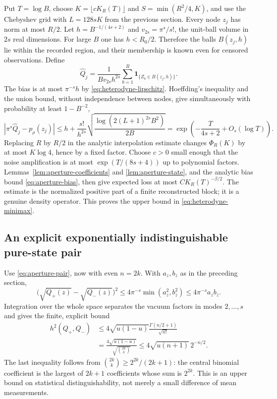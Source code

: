Put $T=\log B$, choose $K=\lfloor cK_R(T)\rfloor$ and
$S=\min(R^2/4,K)$, and use the Chebyshev grid with $L=128sK$ from the
previous section. Every node $z_j$ has norm at most $R/2$. Let
$h=B^{-1/(4s+2)}$ and $v_{2s}=\pi^s/s!$, the unit-ball volume in
$2s$ real dimensions. For large $B$ one has $h<R_0/2$. Therefore the
balls $B(z_j,h)$ lie within the recorded region, and their membership is
known even for censored observations. Define
\[
 \widehat Q_j=\frac{1}{Bv_{2s}h^{2s}}
          \sum_{b=1}^B\mathbf1_{\{Z_b\in B(z_j,h)\}}.
 \tag{B.3}\label{eq:heterodyne-density-estimate}
\]
The bias is at most $\pi^{-s}h$ by \eqref{eq:heterodyne-lipschitz}.
Hoeffding's inequality and the union bound, without independence between
nodes, give simultaneously with probability at least $1-B^{-2}$,
\[
 |\pi^s\widehat Q_j-p_\rho(z_j)|
 \le h+\frac{s!}{h^{2s}}
       \sqrt{\frac{\log(2(L+1)^{2s}B^2)}{2B}}
 =\exp\!\left(-\frac{T}{4s+2}+O_s(\log T)\right).
 \tag{B.4}\label{eq:heterodyne-density-error}
\]
Replacing $R$ by $R/2$ in the analytic interpolation estimate changes
$\Phi_R(K)$ by at most $K\log4$, hence by a fixed factor. Choose $c>0$
small enough that the noise amplification is at most $\exp(T/(8s+4))$
up to polynomial factors. Lemmas~\ref{lem:aperture-coefficients} and
\ref{lem:aperture-state}, and the analytic bias bound
\eqref{eq:aperture-bias}, then give expected loss at most
$CK_R(T)^{-\beta/2}$. The estimate is the normalized positive part of a
finite reconstructed block; it is a genuine density operator. This proves
the upper bound in \eqref{eq:heterodyne-minimax}.

\subsection{An explicit exponentially indistinguishable pure-state pair}
Use \eqref{eq:aperture-pair}, now with even $n=2k$. With $a_z,b_z$ as in
the preceding section,
\[
 \bigl(\sqrt{Q_+(z)}-\sqrt{Q_-(z)}\bigr)^2
       \le4\pi^{-s}\min(a_z^2,b_z^2)
       \le4\pi^{-s}a_zb_z.
\]
Integration over the whole space separates the vacuum factors in modes
$2,\ldots,s$ and gives the finite, explicit bound
\begin{align}
 h^2(Q_+,Q_-)
 &\le4\sqrt{u(1-u)}\frac{\Gamma(n/2+1)}{\sqrt{n!}}\nonumber\\
 &=\frac{4\sqrt{u(1-u)}}{\sqrt{\binom{2k}{k}}}
 \le4\sqrt{u(n+1)}\,2^{-n/2}.
 \tag{B.5}\label{eq:heterodyne-overlap}
\end{align}
The last inequality follows from
$\binom{2k}{k}\ge2^{2k}/(2k+1)$: the central binomial coefficient is the
largest of $2k+1$ coefficients whose sum is $2^{2k}$.
This is an upper bound on statistical distinguishability, not merely a
small difference of mean measurements.

